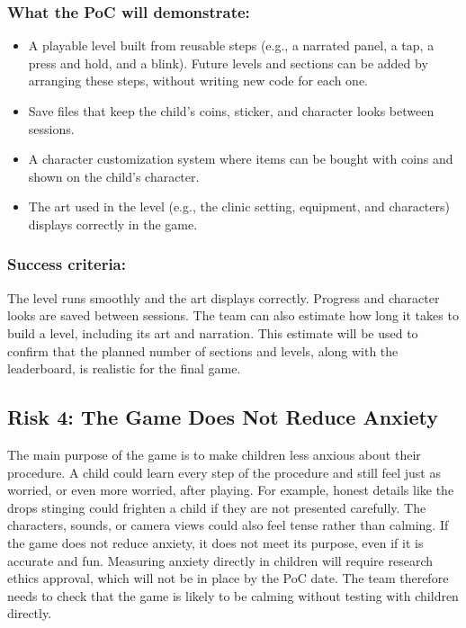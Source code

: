 \documentclass{article}
\begin{document}
\subsubsection*{What the PoC will demonstrate:}
\begin{itemize}
  \item A playable level built from reusable steps (e.g., a narrated panel, a
  tap, a press and hold, and a blink). Future levels and sections can be added
  by arranging these steps, without writing new code for each one.
  \item Save files that keep the child's coins, sticker, and character looks
  between sessions.
  \item A character customization system where items can be bought with coins
  and shown on the child's character.
  \item The art used in the level (e.g., the clinic setting, equipment, and
  characters) displays correctly in the game.
\end{itemize}

\subsubsection*{Success criteria:}
The level runs smoothly and the art displays correctly. Progress and character looks are saved between sessions. The team
can also estimate how long it takes to build a level, including its art and
narration. This estimate will be used to confirm that the planned number of
sections and levels, along with the leaderboard, is realistic for the final
game.

\subsection{Risk 4: The Game Does Not Reduce Anxiety}

The main purpose of the game is to make children less anxious about their
procedure. A child could learn every step of the procedure and still feel just
as worried, or even more worried, after playing. For example, honest details
like the drops stinging could frighten a child if they are not presented
carefully. The characters, sounds, or camera views could also feel tense rather
than calming. If the game does not reduce anxiety, it does not meet its purpose,
even if it is accurate and fun. Measuring anxiety directly in children will
require research ethics approval, which will not be in place by the PoC date.
The team therefore needs to check that the game is likely to be calming without
testing with children directly.
\end{document}
